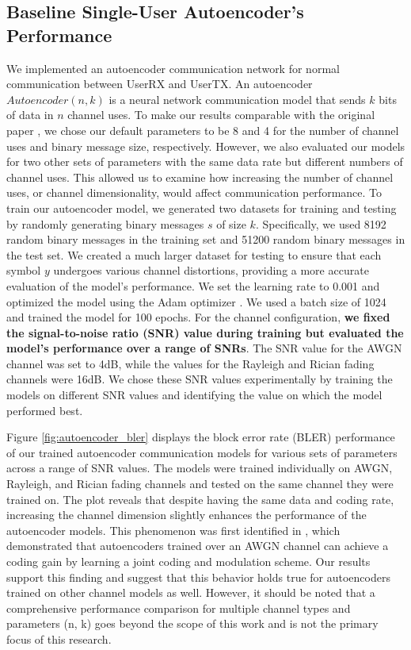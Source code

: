 \subsection{Baseline Single-User Autoencoder's Performance}
We implemented an autoencoder communication network for normal communication between UserRX and UserTX. An autoencoder \(Autoencoder (n, k)\) is a neural network communication model that sends \(k\) bits of data in \(n\) channel uses. To make our results comparable with the original paper \cite{o2017introduction}, we chose our default parameters to be 8 and 4 for the number of channel uses and binary message size, respectively. However, we also evaluated our models for two other sets of parameters with the same data rate but different numbers of channel uses. This allowed us to examine how increasing the number of channel uses, or channel dimensionality, would affect communication performance. To train our autoencoder model, we generated two datasets for training and testing by randomly generating binary messages \(s\) of size \(k\). Specifically, we used 8192 random binary messages in the training set and 51200 random binary messages in the test set. We created a much larger dataset for testing to ensure that each symbol \(y\) undergoes various channel distortions, providing a more accurate evaluation of the model's performance. We set the learning rate to 0.001 and optimized the model using the Adam optimizer \cite{kingma2014adam}. We used a batch size of 1024 and trained the model for 100 epochs. For the channel configuration, \textbf{we fixed the signal-to-noise ratio (SNR) value during training but evaluated the model's performance over a range of SNRs}. The SNR value for the AWGN channel was set to 4dB, while the values for the Rayleigh and Rician fading channels were 16dB. We chose these SNR values experimentally by training the models on different SNR values and identifying the value on which the model performed best.

Figure \ref{fig:autoencoder_bler} displays the block error rate (BLER) performance of our trained autoencoder communication models for various sets of parameters across a range of SNR values. The models were trained individually on AWGN, Rayleigh, and Rician fading channels and tested on the same channel they were trained on.
The plot reveals that despite having the same data and coding rate, increasing the channel dimension slightly enhances the performance of the autoencoder models. This phenomenon was first identified in \cite{o2017introduction}, which demonstrated that autoencoders trained over an AWGN channel can achieve a coding gain by learning a joint coding and modulation scheme. Our results support this finding and suggest that this behavior holds true for autoencoders trained on other channel models as well.
However, it should be noted that a comprehensive performance comparison for multiple channel types and parameters (n, k) goes beyond the scope of this work and is not the primary focus of this research.


